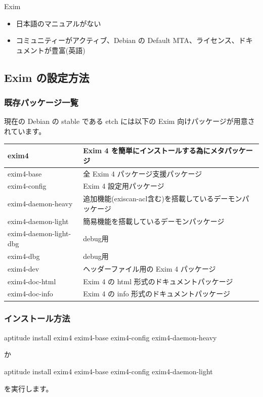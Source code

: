 \documentclass[mingoth,a4paper]{jsarticle}
\begin{document}
{\Large Exim}
\begin{itemize}
\item 日本語のマニュアルがない
\item コミュニティーがアクティブ、Debian の Default MTA、ライセンス、ドキュメントが豊富(英語)
\end{itemize}

\subsection{Exim の設定方法}
\subsubsection{既存パッケージ一覧}
現在の Debian の stable である etch には以下の Exim 向けパッケージが用意されています。

\begin{tabular}[htb]{|l|l|} \hline
exim4&Exim 4 を簡単にインストールする為にメタパッケージ\\ \hline
exim4-base&全 Exim 4 パッケージ支援パッケージ\\ \hline
exim4-config&Exim 4 設定用パッケージ \\ \hline
exim4-daemon-heavy&追加機能(exiscan-acl含む)を搭載しているデーモンパッケージ\\ \hline
exim4-daemon-light&簡易機能を搭載しているデーモンパッケージ\\ \hline
exim4-daemon-light-dbg&debug用\\ \hline
exim4-dbg&debug用\\ \hline
exim4-dev&ヘッダーファイル用の Exim 4 パッケージ \\ \hline
exim4-doc-html&Exim 4 の html 形式のドキュメントパッケージ\\ \hline
exim4-doc-info& Exim 4 の info 形式のドキュメントパッケージ\\ \hline
\end{tabular}

\subsubsection{インストール方法}

\begin{commandline}
aptitude install exim4 exim4-base exim4-config exim4-daemon-heavy
\end{commandline}
か
\begin{commandline}
aptitude install exim4 exim4-base exim4-config exim4-daemon-light
\end{commandline}
を実行します。
\end{document}
